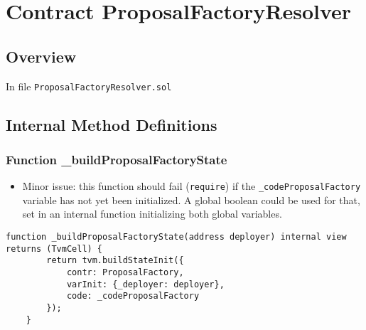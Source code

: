 
\chapter{Contract ProposalFactoryResolver}

\minitoc

\section{Overview}


In file {\tt ProposalFactoryResolver.sol}

\section{Internal Method Definitions}

\subsection{Function \_{}buildProposalFactoryState}

\begin{itemize}
\item Minor issue: this function should fail ({\tt require}) if the
  {\tt \_codeProposalFactory} variable has not yet been initialized. A global
  boolean could be used for that, set in an internal function
  initializing both global variables.
\end{itemize}

\begin{lstlisting}[firstnumber=14]
    function _buildProposalFactoryState(address deployer) internal view returns (TvmCell) {
        return tvm.buildStateInit({
            contr: ProposalFactory,
            varInit: {_deployer: deployer},
            code: _codeProposalFactory
        });
    }
\end{lstlisting}
